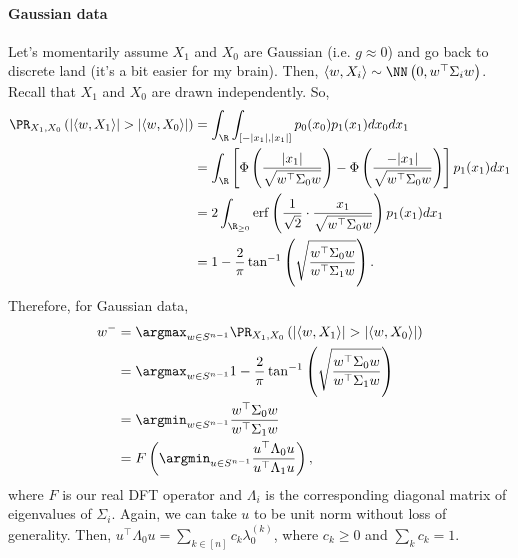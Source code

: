 \documentclass{article}
\begin{document}
\paragraph*{Gaussian data}
Let's momentarily assume $X_1$ and $X_0$ are Gaussian (i.e. $g \approx 0$) and go back to discrete land (it's a bit easier for my brain).
Then, $\langle w, X_i \rangle \sim \NN\left( 0, w^\top \Sigma_i w \right)$.
Recall that $X_1$ and $X_0$ are drawn independently.
So,
\begin{align*}
  \PR_{X_1, X_0} \left( |\langle w, X_1 \rangle| > |\langle w, X_0 \rangle| \right)
  &= \int_{\R} \int_{[-|x_1|,|x_1|]} p_0(x_0) p_1(x_1) dx_0 dx_1 \\
  &= \int_{\R} \left[ \Phi\left( \frac{|x_1|}{\sqrt{w^\top \Sigma_0 w}} \right) - \Phi\left( \frac{-|x_1|}{\sqrt{w^\top \Sigma_0 w}} \right) \right] p_1(x_1) dx_1 \\
  &= 2 \int_{\R_{\geq 0}} \operatorname{erf}\left( \frac{1}{\sqrt{2}} \cdot \frac{x_1}{\sqrt{w^\top \Sigma_0 w}} \right) p_1(x_1) dx_1 \\
  &= 1 - \frac{2}{\pi} \tan^{-1} \left( \sqrt{ \frac{ w^\top \Sigma_0 w }{ w^\top \Sigma_1 w } } \right).
\end{align*}
Therefore, for Gaussian data,
\begin{align*}
  w^- 
  &= \argmax_{w \in S^{n-1}} \PR_{X_1, X_0} \left( |\langle w, X_1 \rangle| > |\langle w, X_0 \rangle| \right) \\
  &= \argmax_{w \in S^{n-1}} 1 - \frac{2}{\pi} \tan^{-1} \left( \sqrt{ \frac{ w^\top \Sigma_0 w }{ w^\top \Sigma_1 w } } \right) \\
  &= \argmin_{w \in S^{n-1}} \frac{ w^\top \Sigma_0 w }{ w^\top \Sigma_1 w } \\
  &= F \left( \argmin_{u \in S^{n-1}} \frac{ u^\top \Lambda_0 u }{ u^\top \Lambda_1 u } \right),
\end{align*}
where $F$ is our real DFT operator and $\Lambda_i$ is the corresponding diagonal matrix of eigenvalues of $\Sigma_i$.
Again, we can take $u$ to be unit norm without loss of generality.
Then, $u^\top \Lambda_0 u = \sum_{k \in [n]} c_k \lambda_0^{(k)}$, where $c_k \geq 0$ and $\sum_k c_k = 1$.
\end{document}
